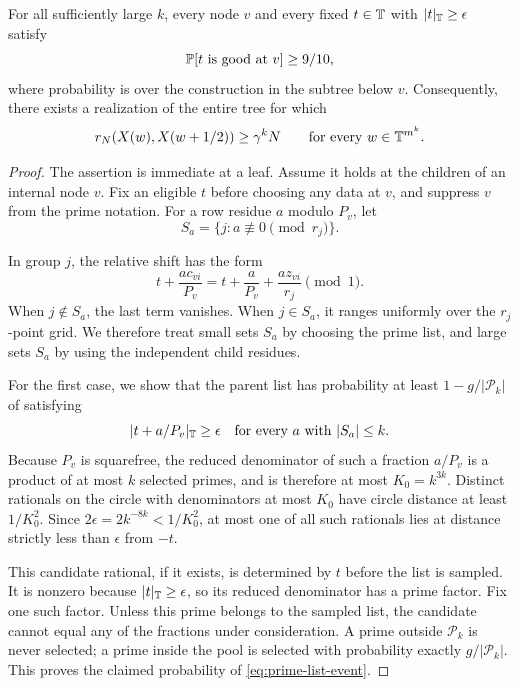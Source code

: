 \begin{proposition}\label{prop:good-probability}
For all sufficiently large $k$, every node $v$ and every fixed
$t\in\mathbb T$ with $|t|_{\mathbb T}\geq\epsilon$ satisfy
\[
 \mathbb P[t\text{ is good at }v]\geq9/10,
\]
where probability is over the construction in the subtree below $v$.
Consequently, there exists a realization of the entire tree for which
\begin{equation}\label{eq:torus-separation}
 r_N(X(w),X(w+1/2))\geq\gamma^kN
 \qquad\text{for every }w\in\mathbb T^{m^k}.
\end{equation}
\end{proposition}
\begin{proof}
The assertion is immediate at a leaf. Assume it holds at the children
of an internal node $v$. Fix an eligible $t$ before choosing any data
at $v$, and suppress $v$ from the prime notation. For a row residue
$a$ modulo $P_v$, let
\[
 S_a=\{j:a\not\equiv0\pmod{r_j}\}.
\]

In group $j$, the relative shift has the form
\[
 t+\frac{a c_{vi}}{P_v}
 =t+\frac a{P_v}+\frac{a z_{vi}}{r_j}\pmod1.
\]
When $j\notin S_a$, the last term vanishes. When $j\in S_a$, it
ranges uniformly over the $r_j$-point grid. We therefore treat small
sets $S_a$ by choosing the prime list, and large sets $S_a$ by using
the independent child residues.

For the first case, we show that the parent list has probability at
least $1-g/|\mathcal P_k|$ of satisfying
\begin{equation}\label{eq:prime-list-event}
 |t+a/P_v|_{\mathbb T}\geq\epsilon
 \quad\text{for every }a\text{ with }|S_a|\leq k.
\end{equation}
Because $P_v$ is squarefree, the reduced denominator of such a fraction
$a/P_v$ is a product of at most $k$ selected primes, and is therefore
at most $K_0=k^{3k}$. Distinct rationals on the circle with denominators
at most $K_0$ have circle distance at least $1/K_0^2$. Since
$2\epsilon=2k^{-8k}<1/K_0^2$, at most one of all such rationals lies
at distance strictly less than $\epsilon$ from $-t$.

This candidate rational, if it exists, is determined by $t$ before
the list is sampled. It is nonzero because $|t|_{\mathbb T}\geq\epsilon$,
so its reduced denominator has a prime factor. Fix one such factor.
Unless this prime belongs to the sampled list, the candidate cannot
equal any of the fractions under consideration. A prime outside
$\mathcal P_k$ is never selected; a prime inside the pool is selected
with probability exactly $g/|\mathcal P_k|$. This proves the claimed
probability of \eqref{eq:prime-list-event}.


\end{proof}
